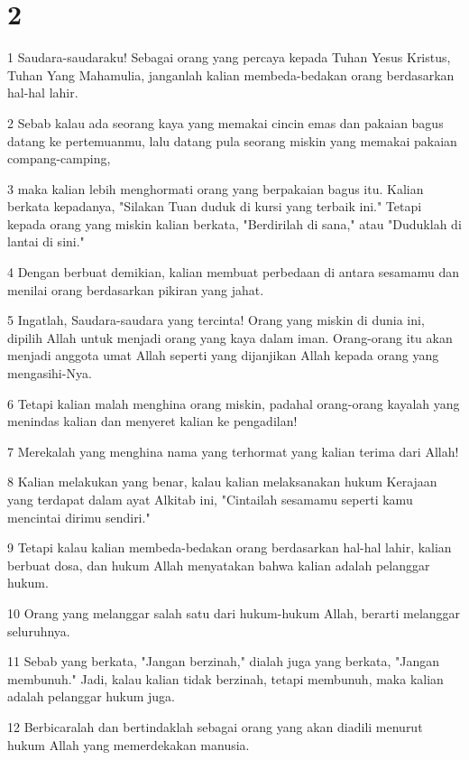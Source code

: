 \chapter{2}

\par 1 Saudara-saudaraku! Sebagai orang yang percaya kepada Tuhan Yesus Kristus, Tuhan Yang Mahamulia, janganlah kalian membeda-bedakan orang berdasarkan hal-hal lahir.
\par 2 Sebab kalau ada seorang kaya yang memakai cincin emas dan pakaian bagus datang ke pertemuanmu, lalu datang pula seorang miskin yang memakai pakaian compang-camping,
\par 3 maka kalian lebih menghormati orang yang berpakaian bagus itu. Kalian berkata kepadanya, "Silakan Tuan duduk di kursi yang terbaik ini." Tetapi kepada orang yang miskin kalian berkata, "Berdirilah di sana," atau "Duduklah di lantai di sini."
\par 4 Dengan berbuat demikian, kalian membuat perbedaan di antara sesamamu dan menilai orang berdasarkan pikiran yang jahat.
\par 5 Ingatlah, Saudara-saudara yang tercinta! Orang yang miskin di dunia ini, dipilih Allah untuk menjadi orang yang kaya dalam iman. Orang-orang itu akan menjadi anggota umat Allah seperti yang dijanjikan Allah kepada orang yang mengasihi-Nya.
\par 6 Tetapi kalian malah menghina orang miskin, padahal orang-orang kayalah yang menindas kalian dan menyeret kalian ke pengadilan!
\par 7 Merekalah yang menghina nama yang terhormat yang kalian terima dari Allah!
\par 8 Kalian melakukan yang benar, kalau kalian melaksanakan hukum Kerajaan yang terdapat dalam ayat Alkitab ini, "Cintailah sesamamu seperti kamu mencintai dirimu sendiri."
\par 9 Tetapi kalau kalian membeda-bedakan orang berdasarkan hal-hal lahir, kalian berbuat dosa, dan hukum Allah menyatakan bahwa kalian adalah pelanggar hukum.
\par 10 Orang yang melanggar salah satu dari hukum-hukum Allah, berarti melanggar seluruhnya.
\par 11 Sebab yang berkata, "Jangan berzinah," dialah juga yang berkata, "Jangan membunuh." Jadi, kalau kalian tidak berzinah, tetapi membunuh, maka kalian adalah pelanggar hukum juga.
\par 12 Berbicaralah dan bertindaklah sebagai orang yang akan diadili menurut hukum Allah yang memerdekakan manusia.
